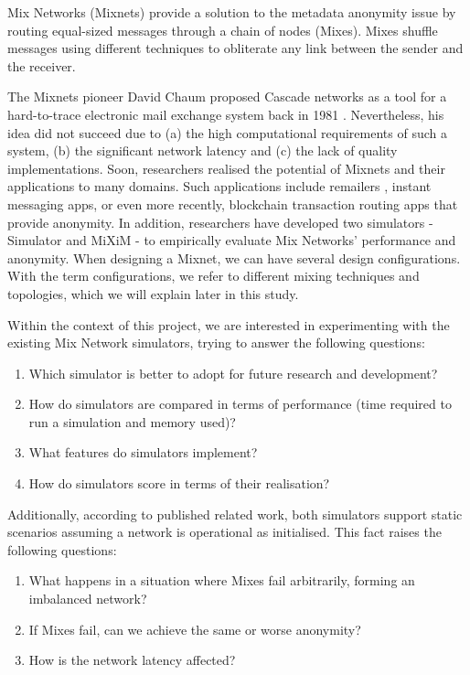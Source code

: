 \documentclass[logo,msc,cyber]{infthesis}   %
\begin{document}
Mix Networks (Mixnets) provide a solution to the metadata anonymity issue by
routing equal-sized messages through a chain of nodes (Mixes). Mixes shuffle
messages using different techniques to obliterate any link between the sender
and the receiver. 

The Mixnets pioneer David Chaum proposed Cascade networks as a tool for a
hard-to-trace electronic mail exchange system back in 1981
\cite{chaum1981untraceable}. Nevertheless, his idea did not succeed due to (a)
the high computational requirements of such a system, (b) the significant
network latency and (c) the lack of quality implementations\cite{ben2021mixim}.
Soon, researchers realised the potential of Mixnets and their applications to
many domains. Such applications include remailers \cite{remailers,mixmaster,
danezis2003mixminion}, instant messaging apps\cite{xx-netowrk-app}, or even more
recently, blockchain transaction routing apps that provide
anonymity\cite{diaz2021nym,xx-netowrk,hopr}. In addition, researchers have
developed two simulators\cite{simulator, mixim} - Simulator and MiXiM - to
empirically evaluate Mix Networks' performance and anonymity. When designing a
Mixnet, we can have several design configurations. With the term configurations,
we refer to different mixing techniques and topologies, which we will explain
later in this study.

Within the context of this project, we are interested in experimenting with the
existing Mix Network simulators, trying to answer the following questions:  

\begin{enumerate}
   \item Which simulator is better to adopt for future research and development?
   \item How do simulators are compared in terms of performance (time required to run a simulation and memory used)?
   \item What features do simulators implement?
   \item How do simulators score in terms of their realisation?
\end{enumerate}
 
Additionally, according to published related work\cite{ben2021mixim,
piotrowska2021studying, guirat2022mixnet}, both simulators support static
scenarios assuming a network is operational as initialised. This fact raises the
following questions:

\begin{enumerate}
   \item What happens in a situation where Mixes fail arbitrarily, forming an imbalanced network?
   \item If Mixes fail, can we achieve the same or worse anonymity?
   \item How is the network latency affected?
\end{enumerate}
\end{document}

